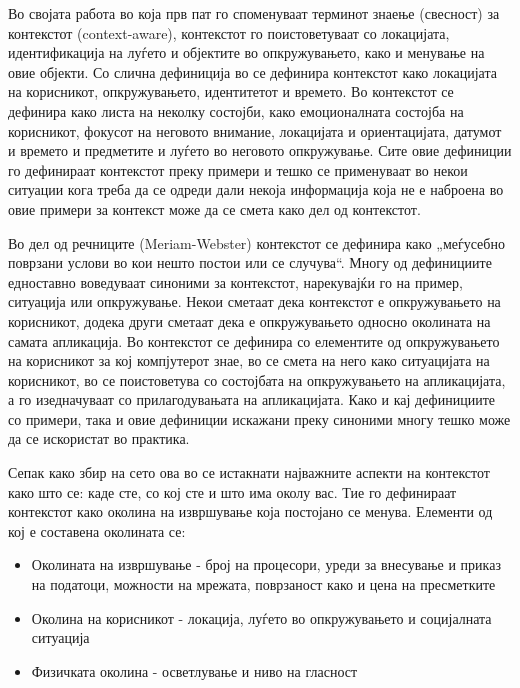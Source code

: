 Во својата работа \cite{schilit1994disseminating} во која прв пат го споменуваат
терминот знаење (свесност) за контекстот (context-aware), контекстот го
поистоветуваат со локацијата, идентификација на луѓето и објектите во
опкружувањето, како и менување на овие објекти. Со слична дефиниција во
\cite{brown1995stick} се дефинира контекстот како локацијата на корисникот,
опкружувањето, идентитетот и времето. Во \cite{dey1998context} контекстот се
дефинира како листа на неколку состојби, како емоционалната состојба на
корисникот, фокусот на неговото внимание, локацијата и ориентацијата, датумот и
времето и предметите и луѓето во неговото опкружување. Сите овие дефиниции го
дефинираат контекстот преку примери и тешко се применуваат во некои ситуации
кога треба да се одреди дали некоја информација која не е наброена во овие
примери за контекст може да се смета како дел од контекстот.

Во дел од речниците (Meriam-Webster) контекстот се дефинира како „меѓусебно
поврзани услови во кои нешто постои или се случува“. Многу од дефинициите
едноставно воведуваат синоними за контекстот, нарекувајќи го на пример,
ситуација или опкружување. Некои сметаат дека контекстот е опкружувањето на
корисникот, додека други сметаат дека е опкружувањето односно околината на
самата апликација. Во \cite{brown1996supporting} контекстот се дефинира со
елементите од опкружувањето на корисникот за кој компјутерот знае, во
\cite{franklin1998all} се смета на него како ситуацијата на корисникот, во
\cite{ward1997new} се поистоветува со состојбата на опкружувањето на
апликацијата, а \cite{rodden1998exploiting} го изедначуваат со прилагодувањата
на апликацијата. Како и кај дефинициите со примери, така и овие дефиниции
искажани преку синоними многу тешко може да се искористат во практика.

Сепак како збир на сето ова во \cite{schilit1994context} се истакнати најважните
аспекти на контекстот како што се: каде сте, со кој сте и што има околу вас. Тие го
дефинираат контекстот како околина на извршување која постојано се менува.
Елементи од кој е составена околината се:
\begin{itemize}
  \item Околината на извршување - број на процесори, уреди за внесување и приказ
  на податоци, можности на мрежата, поврзаност како и цена на пресметките
  \item Околина на корисникот - локација, луѓето во опкружувањето и социјалната
ситуација
  \item Физичката околина - осветлување и ниво на гласност
\end{itemize}

